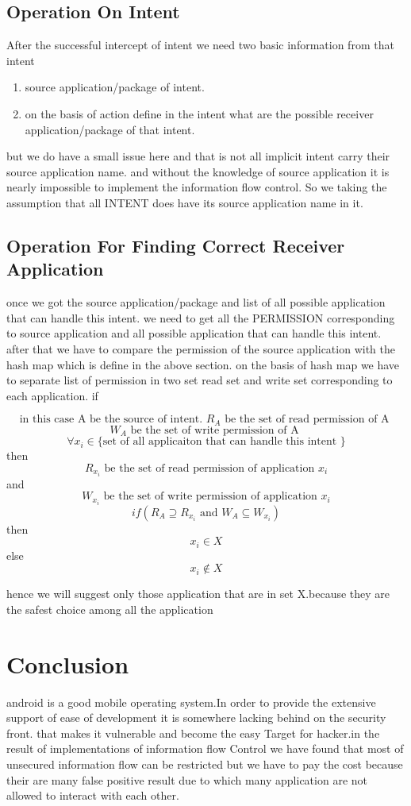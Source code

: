 \documentclass[11pt]{report}
\begin{document}
\section{Operation On Intent}
After the successful intercept of intent 
we need two basic information from that intent 
\begin{enumerate}
 \item source application/package of intent. 
 \item on the basis of action define in the intent what are the possible receiver application/package of that intent.
 
\end{enumerate}
\par 
but we do have a small issue here and that is not all implicit intent carry their source application name.
and without the knowledge of source application it is nearly impossible to implement the information flow control.
So we taking the assumption that all INTENT does have its source application name in it.

\section{Operation For Finding Correct Receiver Application}
once we got the source application/package and list of all possible application that can handle this intent.
we need to get all the PERMISSION corresponding to source application and  all possible application that can handle this intent.
after that we have to compare the permission of the source application with the hash map which is define in the above section.
on the basis of hash map we  have to separate list of permission in two set read set and write set corresponding to each application.
if 

\[ \textrm{in this case A be the source of intent. } R_A \textrm{ be the set of read permission of A }\]
\[ W_A \textrm{ be the set of write permission of A }\]
\[\forall x_i \in \textrm{\{set of all applicaiton that can handle this intent \}} \]
then\[ R_{x_i}\textrm{ be the set of read permission of application }x_i\]
and\[ W_{x_i}\textrm{ be the set of write permission of application }x_i\]
\[ if( R_A \supseteq R_{x_i} \textrm{ and } W_A \subseteq W_{x_i})\]
then \[x_i \in X\]
else \[x_i \notin X\]

hence we will suggest only those application that are in set X.because they are the safest choice 
among all the application

\chapter{Conclusion}
\label{chapter:conclusionandfuturework}
android is a good mobile operating system.In order to provide the extensive support of ease of development it is somewhere lacking behind on the security front.
that makes it vulnerable and become the easy Target for hacker.in the result of implementations of information flow Control we have found that most of unsecured information flow 
can be restricted but we have to pay the cost because their are many false positive result due to which many application are not allowed to interact with each other.
\end{document}
